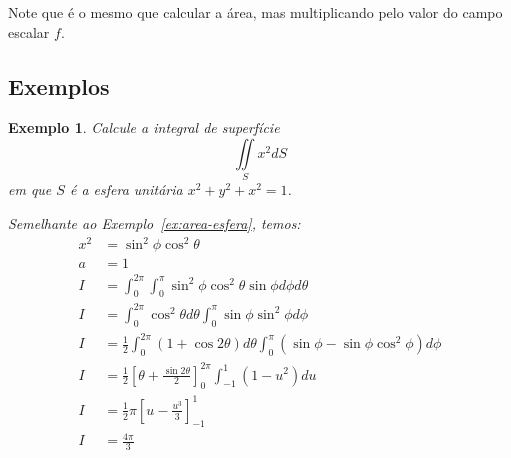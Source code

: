 \documentclass{article}
\newcommand{\doubleint}[2] {\iint\limits_{#1} #2}
\newtheorem{example}{Exemplo}[section]
\begin{document}
        Note que é o mesmo que calcular a área, mas multiplicando pelo valor do campo escalar $f$.

        \subsection{Exemplos}
            \begin{example}
                Calcule a integral de superfície
                \[
                    \doubleint{S} x^2 dS
                \]
                em que $S$ é a esfera unitária $x^2 + y^2 + x^2 = 1$.

                Semelhante ao Exemplo~\ref{ex:area-esfera}, temos:
                \begin{align*}
                    x^2 &= \sin^2\phi \cos^2\theta\\
                    a &= 1\\
                    I &= \int_0^{2\pi} \int_0^\pi \sin^2\phi \cos^2\theta \sin\phi d\phi d\theta\\
                    I &= \int_0^{2\pi} \cos^2\theta d\theta \int_0^\pi \sin\phi \sin^2\phi d\phi\\
                    I &= \frac{1}{2} \int_0^{2\pi} (1 + \cos 2\theta) d\theta \int_0^\pi (\sin\phi - \sin\phi \cos^2\phi) d\phi\\
                    I &= \frac{1}{2} \left[ \theta + \frac{\sin 2\theta}{2} \right]_0^{2\pi} \int_{-1}^{1} (1 - u^2) du\\
                    I &= \frac{1}{2} \pi \left[ u - \frac{u^3}{3} \right]_{-1}^1\\
                    I &= \frac{4\pi}{3}
                \end{align*}
            \end{example}
\end{document}
